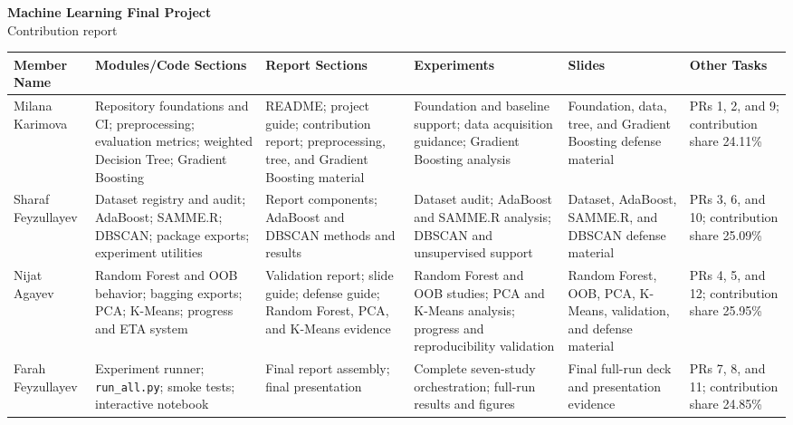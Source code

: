 \documentclass[9pt,landscape]{article}
\begin{document}
\begin{center}
{\Large\bfseries\color{navy} Machine Learning Final Project}\\[2pt]
{\normalsize Contribution report}
\end{center}

\vspace{4pt}
\scriptsize
\renewcommand{\arraystretch}{1.18}
\begin{tabularx}{\textwidth}{p{1.45cm}YYYYY}
\toprule
\textbf{Member Name} & \textbf{Modules/Code Sections} &
\textbf{Report Sections} & \textbf{Experiments} & \textbf{Slides} &
\textbf{Other Tasks} \\
\midrule
Milana Karimova & Repository foundations and CI; preprocessing; evaluation
metrics; weighted Decision Tree; Gradient Boosting & README; project guide;
contribution report; preprocessing, tree, and Gradient Boosting material &
Foundation and baseline support; data acquisition guidance; Gradient Boosting
analysis & Foundation, data, tree, and Gradient Boosting defense material &
PRs 1, 2, and 9; contribution share 24.11\% \\
\addlinespace
Sharaf Feyzullayev & Dataset registry and audit; AdaBoost; SAMME.R; DBSCAN;
package exports; experiment utilities & Report components; AdaBoost and DBSCAN
methods and results & Dataset audit; AdaBoost and SAMME.R analysis; DBSCAN and
unsupervised support & Dataset, AdaBoost, SAMME.R, and DBSCAN defense material &
PRs 3, 6, and 10; contribution share 25.09\% \\
\addlinespace
Nijat Agayev & Random Forest and OOB behavior; bagging exports; PCA; K-Means;
progress and ETA system & Validation report; slide guide; defense guide; Random
Forest, PCA, and K-Means evidence & Random Forest and OOB studies; PCA and
K-Means analysis; progress and reproducibility validation & Random Forest, OOB,
PCA, K-Means, validation, and defense material & PRs 4, 5, and 12; contribution
share 25.95\% \\
\addlinespace
Farah Feyzullayev & Experiment runner; \texttt{run\_all.py}; smoke tests;
interactive notebook & Final report assembly; final presentation & Complete
seven-study orchestration; full-run results and figures & Final full-run deck
and presentation evidence & PRs 7, 8, and 11; contribution share 24.85\% \\
\bottomrule
\end{tabularx}

\vspace{7pt}
\footnotesize
\noindent\texttt{}\\[8pt]
\noindent\texttt{}\\[8pt]
\noindent\texttt{}\\[8pt]
\noindent\texttt{}
\end{document}
